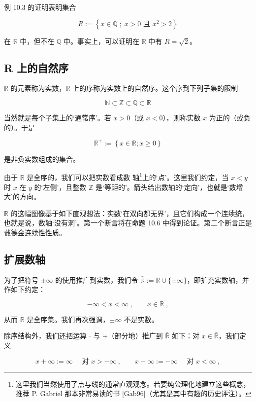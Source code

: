 例 10.3 的证明表明集合

\[
R:=\left\{x\in\mathbb{Q}\;;\;x>0\text{ 且 }x^{2}>2\right\}
\]

在 $ \mathbb{R} $ 中，但不在 $ \mathbb{Q} $ 中。事实上，可以证明在 $ \mathbb{R} $ 中有 $ R = \sqrt{2} $。

\subsection*{R 上的自然序}

$ \mathbb{R} $ 的元素称为实数，$ \mathbb{R} $ 上的序称为实数上的自然序。这个序到下列子集的限制

\[
\mathbb{N}\subset\mathbb{Z}\subset\mathbb{Q}\subset\mathbb{R}
\]

当然就是每个子集上的‘通常序’。若 $ x > 0 $（或 $ x < 0 $），则称实数 $ x $ 为正的（或负的）。于是

\[
\mathbb{R}^{+}:=\left\{x\in\mathbb{R};x\geq0\right\}
\]

是非负实数组成的集合。

由于 $ \mathbb{R} $ 是全序的，我们可以把实数看成数 $\text{轴}$\footnote{这里我们当然使用了点与线的通常直观观念。若要纯公理化地建立这些概念，推荐 P. Gabriel 那本非常易读的书 [Gab96]（尤其是其中有趣的历史评注）。}上的‘点’。这里我们约定，当 $ x < y $ 时 $ x $ 在 $ y $ 的‘左侧’，且整数 $ \mathbb{Z} $ 是‘等距的’。箭头给出数轴的‘定向’，也就是‘数增大’的方向。


$ \mathbb{R} $ 的这幅图像基于如下直观想法：实数‘在双向都无界’，且它们构成一个连续统，也就是说，数轴‘没有洞’。第一个断言将在命题 10.6 中得到论证。第二个断言正是戴德金连续性性质。

\subsection*{扩展数轴}

为了把符号 $ \pm\infty $ 的使用推广到实数，我们令 $ \bar{\mathbb{R}} := \mathbb{R} \cup \{\pm\infty\} $，即扩充实数轴，并作如下约定：

\[
-\infty<x<\infty\;,\qquad x\in\mathbb{R}\;,
\]

从而 $ \bar{\mathbb{R}} $ 是全序集。我们再次强调，$ \pm\infty $ 不是实数。

除序结构外，我们还把运算 $ \cdot $ 与 +（部分地）推广到 $ \bar{\mathbb{R}} $ 如下：对 $ x \in \bar{\mathbb{R}} $，我们定义

\[
x+\infty:=\infty\quad\text{ 对 }x>-\infty\ ,\qquad x-\infty:=-\infty\quad\text{ 对 }x<\infty~,
\]


